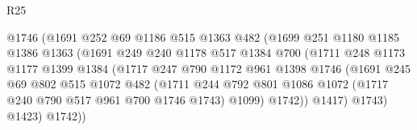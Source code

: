 \begin{lexlean}{R25}
\begin{coremodule}
                                  @1746
                                  (@1691
                                    @252
                                    @69
                                    @1186
                                    @515
                                    @1363
                                    @482
                                    (@1699
                                      @251
                                      @1180
                                      @1185
                                      @1386
                                      @1363
                                      (@1691
                                        @249
                                        @240
                                        @1178
                                        @517
                                        @1384
                                        @700
                                        (@1711
                                          @248
                                          @1173
                                          @1177
                                          @1399
                                          @1384
                                          (@1717
                                            @247
                                            @790
                                            @1172
                                            @961
                                            @1398
                                            @1746
                                            (@1691
                                              @245
                                              @69
                                              @802
                                              @515
                                              @1072
                                              @482
                                              (@1711
                                                @244
                                                @792
                                                @801
                                                @1086
                                                @1072
                                                (@1717 @240 @790 @517 @961 @700 @1746 @1743)
                                                @1099)
                                              @1742))
                                          @1417)
                                        @1743)
                                      @1423)
                                    @1742))

\end{coremodule}
\end{lexlean}

